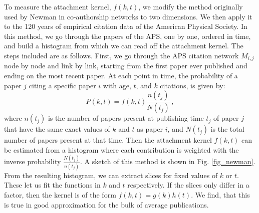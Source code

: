 \documentclass[draft,final]{vutinfth} %
\begin{document}
To measure the attachment kernel, $f(k,t)$, we modify the method originally used by Newman in co-authorship networks \cite{Newman2001} to two dimensions. We then apply it to the 120 years of empirical citation data of the American Physical Society.
In this method, we go through the papers of the APS, one by one, ordered in time, and build a histogram from which we can read off the attachment kernel. The steps included are as follows. First, we go through the APS citation network $M_{i,j}$ node by node and link by link,  starting from the first paper ever published and ending on the most recent paper. At each point in time, the probability of a paper $j$ citing a specific paper $i$ with age,  $t$, and $k$ citations, is given by:
%
\begin{equation}
    P(k,t) = f(k, t) \frac{n(t_j)}{N(t_j)} \, , 
\end{equation}
%
where $n(t_j)$ is the number of papers present at publishing time $t_j$ of paper $j$ that have the same exact values of $k$ and $t$ as paper $i$,  and $N(t_j)$ is the total number of papers present at that time. Then the attachment kernel $f(k,t)$ can be estimated from a histogram where each contribution is weighted with the inverse probability $\frac{N(t_j)}{n(t_j)}$. A sketch of this method is shown in Fig. \ref{fig_newman}.
From the resulting histogram, we can extract slices for fixed values of $k$ or $t$. These let us fit the functions in $k$ and $t$ respectively. If the slices only differ in a factor, then the kernel is of the form $f(k,t)=g(k)h(t)$. We find, that this is true in good approximation for the bulk of average publications. 
\end{document}
